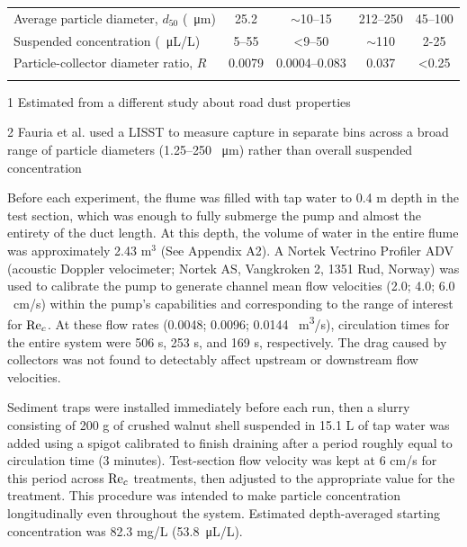 \documentclass[geosciences,article,submit,moreauthors,pdftex]{Definitions/mdpi}
\begin{document}
\begin{table}[h]
\begin{threeparttable}
\begin{tabular}{lcccc}
Average particle diameter, $d_{50}$ (\SI{}{\micro\metre})     
& 25.2        & $\sim$10--15 \tnote{2} & 212--250     & 45--100 \cite{hejduk2010variations,noe2010glades}  \\
Suspended concentration (\SI{}{\micro\liter/\liter})      
& 5--55   & <9--50 \tnote{2}      & $\sim$110   & 2-25 \cite{noe2010glades,aiona2013can}      \\
\midrule
Particle-collector diameter ratio, $R$      
&0.0079       &0.0004--0.083 \tnote{2} & 0.037        & <0.25     \\
\bottomrule
\vspace{-4mm}
\end{tabular}
\begin{tablenotes}
\footnotesize \item[1] Estimated from a different study about road dust properties \cite{mckenzie2008size} 
\vspace{2mm}
\footnotesize \item[2] Fauria et al. \cite{Fauria_2015} used a LISST to measure capture in separate bins across a broad range of particle diameters (1.25--250 \SI{}{\micro\metre}) rather than overall suspended concentration
\end{tablenotes}
\end{threeparttable}
\label{tbl:parameters}
\end{table}

Before each experiment, the flume was filled with tap water to 0.4 m depth in the test section, which was enough to fully submerge the pump and almost the entirety of the duct length. At this depth, the volume of water in the entire flume was approximately 2.43 m$^3$ (See Appendix A2).  A Nortek Vectrino Profiler ADV (acoustic Doppler velocimeter; Nortek AS, Vangkroken 2, 1351 Rud, Norway) was used to calibrate the pump to generate channel mean flow velocities (2.0; 4.0; 6.0 \SI{}{\centi\metre/\second}) within the pump's capabilities and corresponding to the range of interest for $\mathrm{Re}_c$. At these flow rates (0.0048; 0.0096; 0.0144 \SI{}{\metre\cubed/\second}), circulation times for the entire system were 506 s, 253 s, and 169 s, respectively. The drag caused by collectors was not found to detectably affect upstream or downstream flow velocities.

Sediment traps were installed immediately before each run, then a slurry consisting of 200 g of crushed walnut shell suspended in 15.1 L of tap water was added using a spigot calibrated to finish draining after a period roughly equal to circulation time (3 minutes). Test-section flow velocity was kept at 6 cm/s for this period across $\mathrm{Re}_c$ treatments, then adjusted to the appropriate value for the treatment. This procedure was intended to make particle concentration longitudinally even throughout the system. Estimated depth-averaged starting concentration was 82.3 mg/L (\SI{53.8}{\micro\liter/\liter}).
\end{document}
